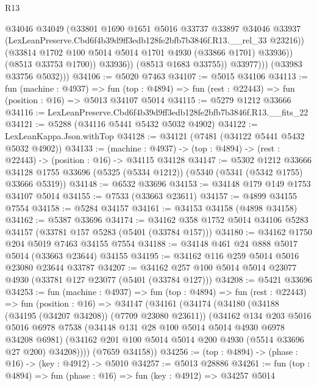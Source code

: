\begin{lexlean}{R13}
\begin{coremodule}
                        @34046
                        @34049
                        (@33801
                          @1690
                          @1651
                          @5016
                          @33737
                          @33897
                          @34046
                          @33937
                          (LexLeanPreserve.Cbd6f4b39d9ff3edb128fe2bfb7b3846f.R13.__rel_33 @23216))
                        (@33814 @1702 @100 @5014 @5014 @1701 @4930 (@33866 @1701) @33936))
                      (@8513 @33753 @1700))
                    @33936))
                (@8513 @1683 @33755))
              @33977)))
        (@33983 @33756 @5032)))
@34106 := @5020 @7463
@34107 := @5015 @34106
@34113 := fun (machine : @4937) =>
  fun (top : @4894) => fun (rest : @22443) => fun (position : @16) => @5013 @34107 @5014
@34115 := @5279 @1212 @33666
@34116 := LexLeanPreserve.Cbd6f4b39d9ff3edb128fe2bfb7b3846f.R13.__fits_22
@34121 := @5288 (@34116 @5441 @5432 @5032 @4902)
@34122 := LexLeanKappa.Json.withTop
@34128 := @34121 (@7481 (@34122 @5441 @5432 @5032 @4902))
@34133 := (machine : @4937) -> (top : @4894) -> (rest : @22443) -> (position : @16) -> @34115 @34128
@34147 := @5302
    @1212
    @33666
    @34128
    @1755
    @33696
    (@5325 (@5334 @1212))
    (@5340 (@5341 (@5342 @1755) @33666 @5319))
@34148 := @6532 @33696
@34153 := @34148 @179 @149 @1753 @34107 @5014
@34155 := @7533 (@33663 @23611)
@34157 := @4899 @34155 @7554
@34158 := @5284 @34157
@34161 := @34153 @34158 (@4898 @34158)
@34162 := @5387 @33696
@34174 := @34162 @358 @1752 @5014 @34106 @5283 @34157 (@33781 @157 @5283 (@5401 (@33784 @157)))
@34180 := @34162 @1750 @204 @5019 @7463 @34155 @7554
@34188 := @34148 @461 @24 @888 @5017 @5014 (@33663 @23644) @34155
@34195 := @34162 @116 @259 @5014 @5016 @23080 @23644 @33787
@34207 := @34162 @257 @100 @5014 @5014 @23077 @4930 (@33781 @127 @23077 (@5401 (@33784 @127)))
@34208 := @5421 @33696
@34253 := fun (machine : @4937) =>
  fun (top : @4894) =>
  fun (rest : @22443) =>
  fun (position : @16) =>
  @34147
    (@34161
      (@34174
        (@34180
          (@34188 (@34195 (@34207 @34208)) (@7709 @23080 @23611))
          (@34162
            @134
            @203
            @5016
            @5016
            @6978
            @7538
            (@34148 @131 @28 @100 @5014 @5014 @4930 @6978 @34208 @6981)
            (@34162 @201 @100 @5014 @5014 @200 @4930 (@5514 @33696 @27 @200) @34208))))
      (@7659 @34158))
@34256 := (top : @4894) -> (phase : @16) -> (key : @4912) -> @5010
@34257 := @5013 @28886
@34261 := fun (top : @4894) => fun (phase : @16) => fun (key : @4912) => @34257 @5014

\end{coremodule}
\end{lexlean}
